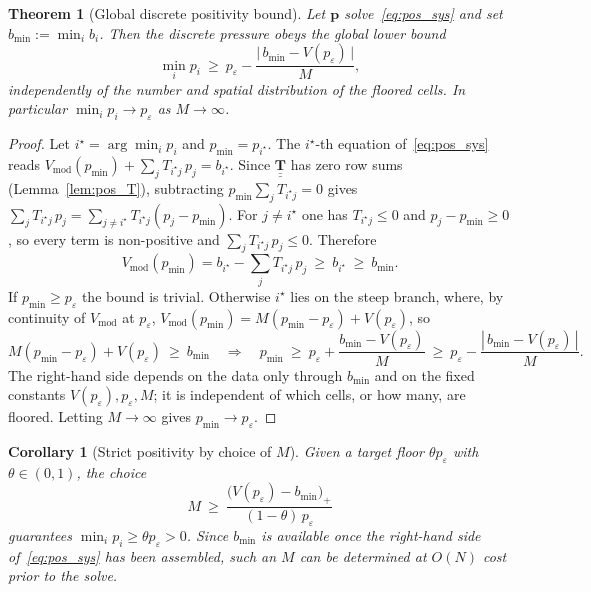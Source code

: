 \documentclass[a4paper,fleqn]{cas-sc}
\newtheorem{theorem}{Theorem}
\newtheorem{corollary}{Corollary}
\theoremstyle{definition}
\theoremstyle{remark}
\begin{document}
\begin{theorem}[Global discrete positivity bound]
\label{thm:pos_global}
Let $\mathbf{p}$ solve~\eqref{eq:pos_sys} and set $b_{\min}:=\min_i b_i$. Then the
discrete pressure obeys the global lower bound
\begin{equation}
\label{eq:pos_global_bound}
\min_i p_i\ \ge\ p_{\varepsilon}
-\frac{\big|\,b_{\min}-V(p_{\varepsilon})\,\big|}{M},
\end{equation}
\emph{independently of the number and spatial distribution of the floored cells}. In
particular $\min_i p_i\to p_{\varepsilon}$ as $M\to\infty$.
\end{theorem}
\begin{proof}
Let $i^{\star}=\arg\min_i p_i$ and $p_{\min}=p_{i^{\star}}$. The $i^{\star}$-th equation
of~\eqref{eq:pos_sys} reads
$V_{\mathrm{mod}}(p_{\min})+\sum_j T_{i^{\star}j}\,p_j=b_{i^{\star}}$. Since
$\underline{\underline{\mathbf{T}}}$ has zero row sums (Lemma~\ref{lem:pos_T}),
subtracting $p_{\min}\sum_j T_{i^{\star}j}=0$ gives
$\sum_j T_{i^{\star}j}\,p_j=\sum_{j\neq i^{\star}}T_{i^{\star}j}(p_j-p_{\min})$. For
$j\neq i^{\star}$ one has $T_{i^{\star}j}\le 0$ and $p_j-p_{\min}\ge 0$, so every term is
non-positive and $\sum_j T_{i^{\star}j}\,p_j\le 0$. Therefore
\begin{equation}
V_{\mathrm{mod}}(p_{\min})=b_{i^{\star}}-\sum_j T_{i^{\star}j}\,p_j
\ \ge\ b_{i^{\star}}\ \ge\ b_{\min}.
\end{equation}
If $p_{\min}\ge p_{\varepsilon}$ the bound is trivial. Otherwise $i^{\star}$ lies on the
steep branch, where, by continuity of $V_{\mathrm{mod}}$ at $p_{\varepsilon}$,
$V_{\mathrm{mod}}(p_{\min})=M(p_{\min}-p_{\varepsilon})+V(p_{\varepsilon})$, so
\begin{equation}
M(p_{\min}-p_{\varepsilon})+V(p_{\varepsilon})\ \ge\ b_{\min}
\quad\Longrightarrow\quad
p_{\min}\ \ge\ p_{\varepsilon}+\frac{b_{\min}-V(p_{\varepsilon})}{M}
\ \ge\ p_{\varepsilon}-\frac{|\,b_{\min}-V(p_{\varepsilon})\,|}{M}.
\end{equation}
The right-hand side depends on the data only through $b_{\min}$ and on the fixed
constants $V(p_{\varepsilon}),p_{\varepsilon},M$; it is independent of which cells, or
how many, are floored. Letting $M\to\infty$ gives $p_{\min}\to p_{\varepsilon}$.
\end{proof}

\begin{corollary}[Strict positivity by choice of $M$]
\label{cor:pos_strict}
Given a target floor $\theta p_{\varepsilon}$ with $\theta\in(0,1)$, the choice
\begin{equation}
\label{eq:pos_Mchoice}
M\ \ge\ \frac{\big(V(p_{\varepsilon})-b_{\min}\big)_{+}}{(1-\theta)\,p_{\varepsilon}}
\end{equation}
guarantees $\min_i p_i\ge\theta p_{\varepsilon}>0$. Since $b_{\min}$ is available once
the right-hand side of~\eqref{eq:pos_sys} has been assembled, such an $M$ can be
determined at $O(N)$ cost prior to the solve.
\end{corollary}
\end{document}
